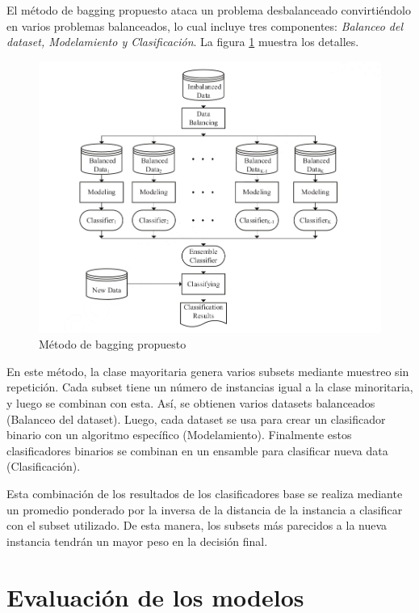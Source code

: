 El método de bagging propuesto \cite{sun2015novel} ataca un problema desbalanceado convirtiéndolo en varios problemas balanceados, lo cual incluye tres componentes: \textit{Balanceo del dataset, Modelamiento y Clasificación}. La figura \ref{fig:bagging-imbalanced} muestra los detalles.

\begin{figure}
    \centering
    \caption{Método de bagging propuesto}
    \label{fig:bagging-imbalanced}
    \includegraphics[width=\linewidth]{graficos/bagging_imbalanced.png}
\end{figure}

En este método, la clase mayoritaria genera varios subsets mediante muestreo sin repetición. Cada subset tiene un número de instancias igual a la clase minoritaria, y luego se combinan con esta. Así, se obtienen varios datasets balanceados (Balanceo del dataset). Luego, cada dataset se usa para crear un clasificador binario con un algoritmo específico (Modelamiento). Finalmente estos clasificadores binarios se combinan en un ensamble para clasificar nueva data (Clasificación).

Esta combinación de los resultados de los clasificadores base se realiza mediante un promedio ponderado por la inversa de la distancia de la instancia a clasificar con el subset utilizado. De esta manera, los subsets más parecidos a la nueva instancia tendrán un mayor peso en la decisión final.


\section{Evaluación de los modelos}

